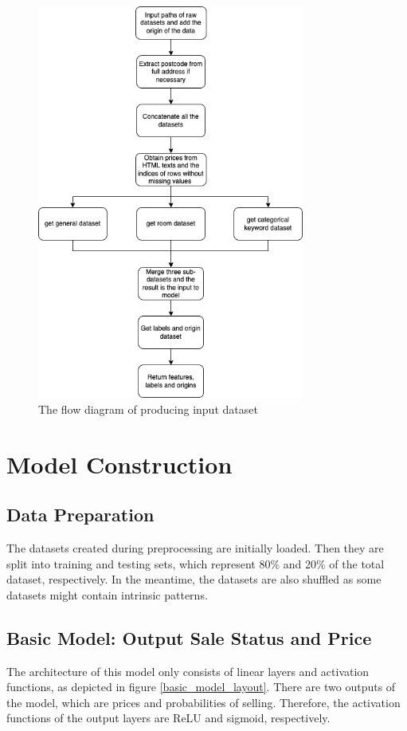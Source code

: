 \documentclass[12pt,twoside]{report}
\begin{document}
\begin{figure}[h]
	\centering
	\includegraphics[height=13cm]{create_input_dataset}
	\caption{The flow diagram of producing  input dataset}
	\label{create_input_dataset}
\end{figure}

\section{Model Construction}

\subsection{Data Preparation}
The datasets created during preprocessing are initially loaded. Then they are split into training and testing sets, which represent 80\% and 20\% of the total dataset, respectively. In the meantime, the datasets are also shuffled as some datasets might contain intrinsic patterns.

\subsection{Basic Model: Output Sale Status and Price}
The architecture of this model only consists of linear layers and activation functions, as depicted in figure \ref{basic_model_layout}. There are two outputs of the model, which are prices and probabilities of selling. Therefore, the activation functions of the output layers are ReLU and sigmoid, respectively.
\\
\end{document}
